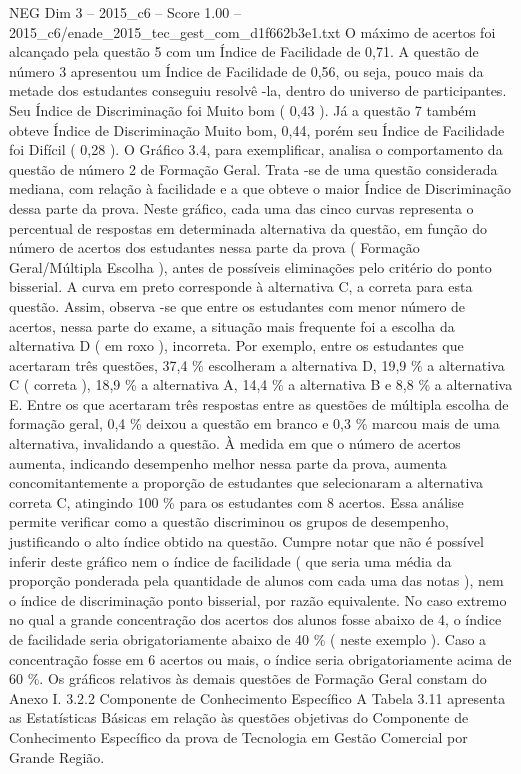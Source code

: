 \begin{textsample}{NEG Dim 3 – 2015\_c6 – Score 1.00 – 2015\_c6/enade\_2015\_tec\_gest\_com\_d1f662b3e1.txt}
O máximo de acertos foi alcançado pela questão 5 com um Índice de Facilidade de 0,71.
A questão de número 3 apresentou um Índice de Facilidade de 0,56, ou seja, pouco mais da metade dos estudantes conseguiu resolvê -la, dentro do universo de participantes.
Seu Índice de Discriminação foi Muito bom ( 0,43 ).
Já a questão 7 também obteve Índice de Discriminação Muito bom, 0,44, porém seu Índice de Facilidade foi Difícil ( 0,28 ).
O Gráfico 3.4, para exemplificar, analisa o comportamento da questão de número 2 de Formação Geral.
Trata -se de uma questão considerada mediana, com relação à facilidade e a que obteve o maior Índice de Discriminação dessa parte da prova.
Neste gráfico, cada uma das cinco curvas representa o percentual de respostas em determinada alternativa da questão, em função do número de acertos dos estudantes nessa parte da prova ( Formação Geral/Múltipla Escolha ), antes de possíveis eliminações pelo critério do ponto bisserial.
A curva em preto corresponde à alternativa C, a correta para esta questão.
Assim, observa -se que entre os estudantes com menor número de acertos, nessa parte do exame, a situação mais frequente foi a escolha da alternativa D ( em roxo ), incorreta.
Por exemplo, entre os estudantes que acertaram três questões, 37,4 \% escolheram a alternativa D, 19,9 \% a alternativa C ( correta ), 18,9 \% a alternativa A, 14,4 \% a alternativa B e 8,8 \% a alternativa E.
Entre os que acertaram três respostas entre as questões de múltipla escolha de formação geral, 0,4 \% deixou a questão em branco e 0,3 \% marcou mais de uma alternativa, invalidando a questão.
À medida em que o número de acertos aumenta, indicando desempenho melhor nessa parte da prova, aumenta concomitantemente a proporção de estudantes que selecionaram a alternativa correta C, atingindo 100 \% para os estudantes com 8 acertos.
Essa análise permite verificar como a questão discriminou os grupos de desempenho, justificando o alto índice obtido na questão.
Cumpre notar que não é possível inferir deste gráfico nem o índice de facilidade ( que seria uma média da proporção ponderada pela quantidade de alunos com cada uma das notas ), nem o índice de discriminação ponto bisserial, por razão equivalente.
No caso extremo no qual a grande concentração dos acertos dos alunos fosse abaixo de 4, o índice de facilidade seria obrigatoriamente abaixo de 40 \% ( neste exemplo ).
Caso a concentração fosse em 6 acertos ou mais, o índice seria obrigatoriamente acima de 60 \%.
Os gráficos relativos às demais questões de Formação Geral constam do Anexo I. 3.2.2 Componente de Conhecimento Específico A Tabela 3.11 apresenta as Estatísticas Básicas em relação às questões objetivas do Componente de Conhecimento Específico da prova de Tecnologia em Gestão Comercial por Grande Região.

\end{textsample}
